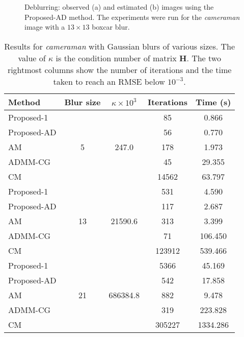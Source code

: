 \documentclass[10pt,twocolumn,twoside]{IEEEtran}
\newcommand{\Hm}{\mathbf{H}} %
\begin{document}
\begin{figure}[!t]
		\vspace{-10pt}
	\centering
	\hfil
	\caption{Deblurring: observed (a) and estimated (b) images using the Proposed-AD method. The experiments were run for the \textit{cameraman} image with a $13 \times 13$ boxcar blur.}
	\label{fig:cameraman}
		\vspace{-15pt}
\end{figure}

\begin{table}
	\renewcommand{\arraystretch}{1}
	\caption{Results for \textit{cameraman} with Gaussian blurs of various sizes. The value of $\kappa$ is the condition number of matrix $\Hm$. The two rightmost columns show the number of iterations and the time taken to reach an RMSE below $10^{-3}$.}
	\label{tab:results}
	\centering
\begin{tabular}{l|c|c|c|c}
Method &Blur size &$\kappa \times 10^3$ &Iterations &Time (s) \\
\hline
Proposed-1 & \multirow{5}{*}{5} & \multirow{5}{*}{247.0} &   85 & 0.866  \\ 
Proposed-AD & & &   56 & 0.770 \\ 
AM & & &  178 & 1.973 \\ 
ADMM-CG & & &   45 & 29.355 \\ 
CM & & & 14562 & 63.797 \\ 
\hline 
Proposed-1 & \multirow{5}{*}{13} & \multirow{5}{*}{21590.6} &  531 & 4.590  \\ 
Proposed-AD & & &  117 & 2.687 \\ 
AM & & &  313 & 3.399 \\ 
ADMM-CG & & &   71 & 106.450 \\ 
CM & & & 123912 & 539.466 \\ 
\hline 
Proposed-1 & \multirow{5}{*}{21} & \multirow{5}{*}{686384.8} & 5366 & 45.169  \\ 
Proposed-AD & & &  542 & 17.858 \\ 
AM & & &  882 & 9.478 \\ 
ADMM-CG & & &  319 & 223.828 \\ 
CM & & & 305227 & 1334.286 \\ 
\hline 
\end{tabular}
\end{table}
\end{document}
